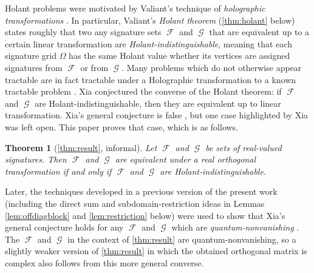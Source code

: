 \documentclass{article}
\newtheorem{theorem}{Theorem}\newtheorem{lemma}[theorem]{Lemma}\newtheorem{proposition}[theorem]{Proposition}\newtheorem{corollary}[theorem]{Corollary}\newtheorem{definition}[theorem]{Definition}\newtheorem{claim}[theorem]{Claim}\newtheorem{remark}[theorem]{Remark}\newtheorem{conjecture}[theorem]{Conjecture}
\DeclareMathOperator{\fc}{\mathcal{F}}
\DeclareMathOperator{\gc}{\mathcal{G}}
\begin{document}
Holant problems were motivated by Valiant's technique of \emph{holographic
transformations} \cite{valiant}. In particular, Valiant's \emph{Holant theorem} (\autoref{thm:holant}
below) states roughly that two any signature sets $\fc$ and $\gc$ that are 
equivalent up to a certain 
linear transformation are \emph{Holant-indistinguishable}, meaning that each signature grid $\Omega$
has the same Holant value whether its vertices are assigned signatures from $\fc$ or from 
$\gc$.
Many problems which do not otherwise appear tractable are in fact tractable under a Holographic
transformation to a known tractable problem \cite{valiant_2006_accidental}.
Xia \cite{xia} conjectured the converse of the Holant theorem: if $\fc$ and
$\gc$ are Holant-indistinguishable, then they are equivalent up to linear transformation.
Xia's general conjecture is false \cite{cai_complete_2016}, but one case highlighted
by Xia was left open. This paper proves that case, which is as follows.
\begin{theorem}[\autoref{thm:result}, informal]
    Let $\fc$ and $\gc$ be sets of real-valued signatures. Then $\fc$ and $\gc$ are equivalent under
    a real orthogonal transformation if and only if $\fc$ and $\gc$ are Holant-indistinguishable.
\end{theorem}
Later, the techniques developed in a previous version of
the present work 
\cite{orthogonal} (including the direct sum and subdomain-restriction ideas in
Lemmas \ref{lem:offdiagblock} and \ref{lem:restriction} below) were used
to show that Xia's general conjecture holds for any $\fc$ and
$\gc$ which are \emph{quantum-nonvanishing} \cite{bipartite}.
The $\fc$ and $\gc$ in the context of
\autoref{thm:result} are quantum-nonvanishing, so a slightly weaker version of 
\autoref{thm:result} in which the obtained orthogonal matrix is complex 
also follows from this more general converse. 
\end{document}
